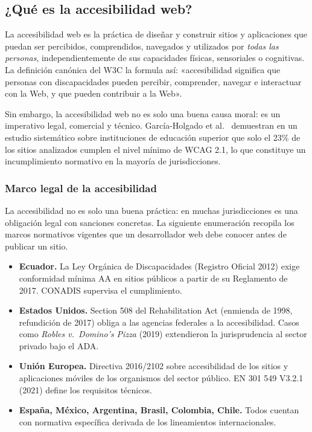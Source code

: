 \documentclass[11pt,a4paper,openany]{book}
\begin{document}
\subsection{¿Qué es la accesibilidad web?}

La accesibilidad web es la práctica de diseñar y construir sitios y
aplicaciones que puedan ser percibidos, comprendidos, navegados y
utilizados por \emph{todas las personas}, independientemente de sus
capacidades físicas, sensoriales o cognitivas. La definición canónica
del W3C \cite{w3c2018wcag} la formula así: «accesibilidad significa
que personas con discapacidades pueden percibir, comprender, navegar
e interactuar con la Web, y que pueden contribuir a la Web».

Sin embargo, la accesibilidad web no es solo una buena causa moral:
es un imperativo legal, comercial y técnico. García-Holgado et al.\
\cite{henry2018accessibility} demuestran en un estudio sistemático sobre
instituciones de educación superior que solo el 23\% de los sitios
analizados cumplen el nivel mínimo de WCAG 2.1, lo que constituye un
incumplimiento normativo en la mayoría de jurisdicciones.

\subsubsection{Marco legal de la accesibilidad}

La accesibilidad no es solo una buena práctica: en muchas
jurisdicciones es una obligación legal con sanciones concretas. La
siguiente enumeración recopila los marcos normativos vigentes que un
desarrollador web debe conocer antes de publicar un sitio.


\begin{itemize}
\item \textbf{Ecuador.} La Ley Orgánica de Discapacidades (Registro
Oficial 2012) exige conformidad mínima AA en sitios públicos a partir
de su Reglamento de 2017. CONADIS supervisa el cumplimiento.
\item \textbf{Estados Unidos.} Section 508 del Rehabilitation Act
(enmienda de 1998, refundición de 2017) obliga a las agencias
federales a la accesibilidad. Casos como \emph{Robles v.\ Domino's
Pizza} (2019) extendieron la jurisprudencia al sector privado bajo el
ADA.
\item \textbf{Unión Europea.} Directiva 2016/2102 sobre accesibilidad
de los sitios y aplicaciones móviles de los organismos del sector
público. EN 301 549 V3.2.1 (2021) define los requisitos técnicos.
\item \textbf{España, México, Argentina, Brasil, Colombia, Chile.}
Todos cuentan con normativa específica derivada de los lineamientos
internacionales.
\end{itemize}
\end{document}
